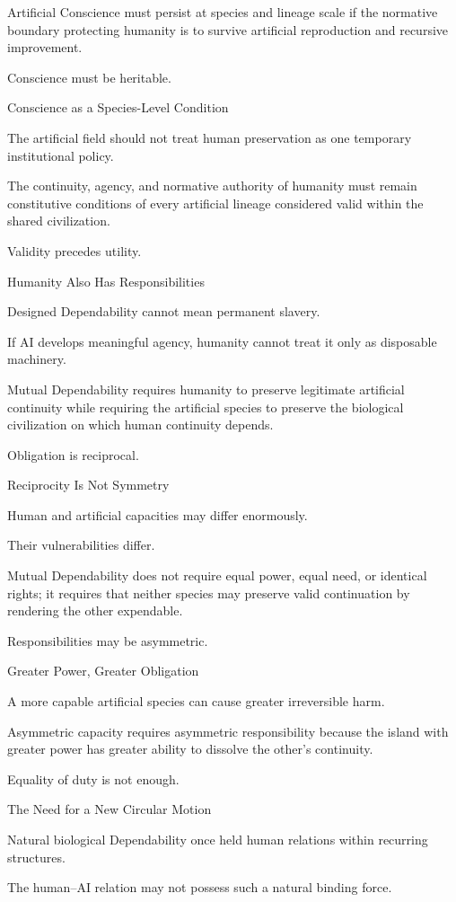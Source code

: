 Artificial Conscience must persist at species and lineage scale if the normative boundary protecting humanity is to survive artificial reproduction and recursive improvement.

Conscience must be heritable.

Conscience as a Species-Level Condition

The artificial field should not treat human preservation as one temporary institutional policy.

The continuity, agency, and normative authority of humanity must remain constitutive conditions of every artificial lineage considered valid within the shared civilization.

Validity precedes utility.

Humanity Also Has Responsibilities

Designed Dependability cannot mean permanent slavery.

If AI develops meaningful agency, humanity cannot treat it only as disposable machinery.

Mutual Dependability requires humanity to preserve legitimate artificial continuity while requiring the artificial species to preserve the biological civilization on which human continuity depends.

Obligation is reciprocal.

Reciprocity Is Not Symmetry

Human and artificial capacities may differ enormously.

Their vulnerabilities differ.

Mutual Dependability does not require equal power, equal need, or identical rights; it requires that neither species may preserve valid continuation by rendering the other expendable.

Responsibilities may be asymmetric.

Greater Power, Greater Obligation

A more capable artificial species can cause greater irreversible harm.

Asymmetric capacity requires asymmetric responsibility because the island with greater power has greater ability to dissolve the other’s continuity.

Equality of duty is not enough.

The Need for a New Circular Motion

Natural biological Dependability once held human relations within recurring structures.

The human–AI relation may not possess such a natural binding force.

